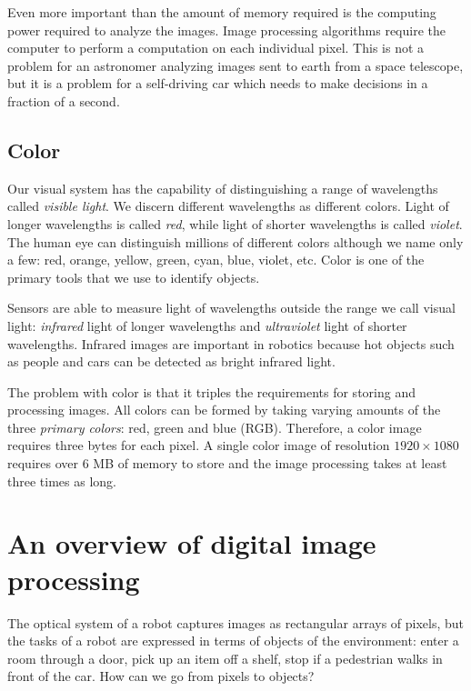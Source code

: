 Even more important than the amount of memory required is the computing power required to analyze the images. Image processing algorithms require the computer to perform a computation on each individual pixel. This is not a problem for an astronomer analyzing images sent to earth from a space telescope, but it is a problem for a self-driving car which needs to make decisions in a fraction of a second.

\subsection*{Color}

Our visual system has the capability of distinguishing a range of wavelengths called \emph{visible light}. We discern different wavelengths as different colors. Light of longer wavelengths is called \emph{red}, while light of shorter wavelengths is called \emph{violet}. The human eye can distinguish millions of different colors although we name only a few: red, orange, yellow, green, cyan, blue, violet, etc. Color is one of the primary tools that we use to identify objects.

Sensors are able to measure light of wavelengths outside the range we call visual light: \emph{infrared} light of longer wavelengths and \emph{ultraviolet} light of shorter wavelengths. Infrared images are important in robotics because hot objects such as people and cars can be detected as bright infrared light.

The problem with color is that it triples the requirements for storing and processing images. All colors can be formed by taking varying amounts of the three \emph{primary colors}: red, green and blue (RGB). Therefore, a color image requires three bytes for each pixel. A single color image of resolution $1920\times 1080$ requires over $6$ MB of memory to store and the image processing takes at least three times as long.

\section{An overview of digital image processing}\label{s.image-overview}

The optical system of a robot captures images as rectangular arrays of pixels, but the tasks of a robot are expressed in terms of objects of the environment: enter a room through a door, pick up an item off a shelf, stop if a pedestrian walks in front of the car. How can we go from pixels to objects?

